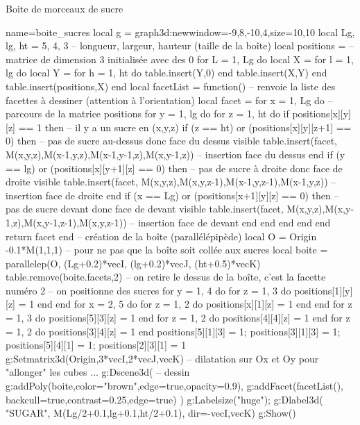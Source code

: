 \begin{demo}{Boite de morceaux de sucre}
\begin{luadraw}{name=boite_sucres}
local g = graph3d:new{window={-9,8,-10,4},size={10,10}}
local Lg, lg, ht = 5, 4, 3 -- longueur, largeur, hauteur (taille de la boîte)
local positions = {} -- matrice de dimension 3 initialisée avec des 0
for L = 1, Lg do
    local X = {}
    for l = 1, lg do
        local Y = {}
        for h = 1, ht do table.insert(Y,0) end
        table.insert(X,Y)
    end
    table.insert(positions,X)
end
local facetList = function() -- renvoie la liste des facettes à dessiner (attention à l'orientation)
    local facet = {}
    for x = 1, Lg do -- parcours de la matrice positions
        for y = 1, lg do
            for z = 1, ht do
                if positions[x][y][z] == 1 then -- il y a un sucre en (x,y,z)
                    if (z == ht) or (positions[x][y][z+1] == 0) then -- pas de sucre au-dessus donc face du dessus visible
                        table.insert(facet, {M(x,y,z),M(x-1,y,z),M(x-1,y-1,z),M(x,y-1,z)}) -- insertion face du dessus
                    end
                    if (y == lg) or (positions[x][y+1][z] == 0) then -- pas de sucre à droite donc face de droite visible
                        table.insert(facet, {M(x,y,z),M(x,y,z-1),M(x-1,y,z-1),M(x-1,y,z)}) -- insertion face de droite
                    end
                    if (x == Lg) or (positions[x+1][y][z] == 0) then -- pas de sucre devant donc face de devant visible
                        table.insert(facet, {M(x,y,z),M(x,y-1,z),M(x,y-1,z-1),M(x,y,z-1)}) -- insertion face de devant
                    end
                end
            end
        end
    end
    return facet
end
-- création de la boîte (parallélépipède)
local O = Origin -0.1*M(1,1,1) -- pour ne pas que la boîte soit collée aux sucres
local boite = parallelep(O, (Lg+0.2)*vecI, (lg+0.2)*vecJ, (ht+0.5)*vecK)
table.remove(boite.facets,2) -- on retire le dessus de la boîte, c'est la facette numéro 2
-- on positionne des sucres
for y = 1, 4 do for z = 1, 3 do  positions[1][y][z] = 1 end end
for x = 2, 5 do for z = 1, 2 do positions[x][1][z] = 1 end end
for z = 1, 3 do positions[5][3][z] = 1 end
for z = 1, 2 do positions[4][4][z] = 1 end
for z = 1, 2 do positions[3][4][z] = 1 end
positions[5][1][3] = 1; positions[3][1][3] = 1; positions[5][4][1] = 1; positions[2][3][1] = 1
g:Setmatrix3d({Origin,3*vecI,2*vecJ,vecK}) -- dilatation sur Ox et Oy pour "allonger" les cubes ...
g:Dscene3d( -- dessin
    g:addPoly(boite,{color="brown",edge=true,opacity=0.9}),
    g:addFacet(facetList(), {backcull=true,contrast=0.25,edge=true})    )
g:Labelsize("huge"); g:Dlabel3d( "SUGAR", M(Lg/2+0.1,lg+0.1,ht/2+0.1), {dir={-vecI,vecK}})
g:Show()
\end{luadraw}
\end{demo}

